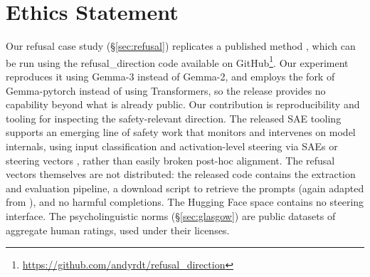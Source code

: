 \documentclass[11pt]{article}
\begin{document}
\section*{Ethics Statement}
Our refusal case study (\S\ref{sec:refusal}) replicates a published method \cite{arditi2024refusallanguagemodelsmediated}, which can be run using the refusal\_direction code available on GitHub\footnote{\url{https://github.com/andyrdt/refusal_direction}}. Our experiment reproduces it using Gemma-3 instead of Gemma-2, and employs the fork of Gemma-pytorch instead of using Transformers, so the release provides no capability beyond what is already public. Our contribution is reproducibility and tooling for inspecting the safety-relevant direction. The released SAE tooling supports an emerging line of safety work that monitors and intervenes on model internals, using input classification and activation-level steering via SAEs or steering vectors \cite{lu2026assistantaxissituatingstabilizing}, rather than easily broken post-hoc alignment. The refusal vectors themselves are not distributed: the released code contains the extraction and evaluation pipeline, a download script to retrieve the prompts (again adapted from \citep{arditi2024refusallanguagemodelsmediated}), and no harmful completions. The Hugging Face space contains no steering interface. The psycholinguistic norms (\S\ref{sec:glasgow}) are public datasets of aggregate human ratings, used under their licenses.








\end{document}
